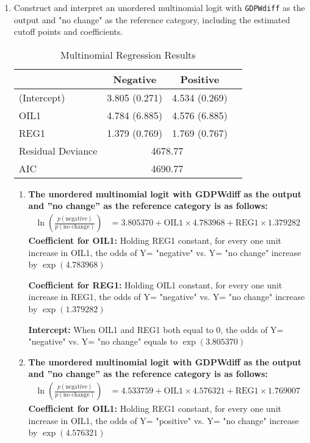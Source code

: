 \documentclass[12pt,letterpaper]{article}
\begin{document}
\begin{enumerate}
	\item Construct and interpret an unordered multinomial logit with \texttt{GDPWdiff} as the output and "no change" as the reference category, including the estimated cutoff points and coefficients.
	
	 
	\begin{table}[htbp]
		\centering
		\caption{Multinomial Regression Results}
		\begin{tabular}{lccc}
			\toprule
			& \textbf{Negative} & \textbf{Positive} \\
			\midrule
			(Intercept) & 3.805 (0.271) & 4.534 (0.269) \\
			OIL1  & 4.784 (6.885) & 4.576 (6.885) \\
			REG1  & 1.379 (0.769) & 1.769 (0.767) \\
			\midrule
			Residual Deviance & \multicolumn{2}{c}{4678.77} \\
			AIC   & \multicolumn{2}{c}{4690.77} \\
			\bottomrule
		\end{tabular}%
		\label{tab:multinom_results}%
	\end{table}%
	\begin{enumerate}
		\item \textbf{The unordered multinomial logit with GDPWdiff as the output and ”no change” as the reference category is as follows:}
		\begin{align*}
			\ln\left(\frac{p(\text{negative})}{p(\text{no change})}\right) &= 3.805370 + \text{OIL1} \times 4.783968 + \text{REG1} \times 1.379282
		\end{align*}
		\textbf{Coefficient for OIL1:}
		Holding REG1 constant, for every one unit increase in OIL1, the odds of Y= "negative" vs. Y= "no change" increase by $\exp(4.783968)$
		
		\textbf{Coefficient for REG1:}
		Holding OIL1 constant, for every one unit increase in REG1, the odds of Y= "negative" vs. Y= "no change" increase by $\exp(1.379282)$
		
		\textbf{Intercept:}
		When OIL1 and REG1 both equal to 0, the odds of Y= "negative" vs. Y= "no change" equals to $\exp(3.805370)$
		
		\item \textbf{The unordered multinomial logit with GDPWdiff as the output and ”no change” as the reference category is as follows:}
		\begin{align*}
			\ln\left(\frac{p(\text{negative})}{p(\text{no change})}\right) &= 4.533759 + \text{OIL1} \times 4.576321 + \text{REG1} \times 1.769007
		\end{align*}
		\textbf{Coefficient for OIL1:}
		Holding REG1 constant, for every one unit increase in OIL1, the odds of Y= "positive" vs. Y= "no change" increase by $\exp(4.576321)$
		

\end{enumerate}
\end{enumerate}
\end{document}
